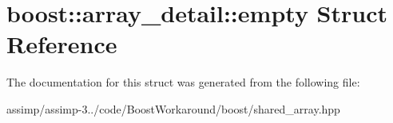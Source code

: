 \hypertarget{structboost_1_1array__detail_1_1empty}{\section{boost\+:\+:array\+\_\+detail\+:\+:empty Struct Reference}
\label{structboost_1_1array__detail_1_1empty}
}


The documentation for this struct was generated from the following file\+:\begin{DoxyCompactItemize}
\item 
assimp/assimp-\/3../code/\+Boost\+Workaround/boost/shared\+\_\+array.\+hpp\end{DoxyCompactItemize}
